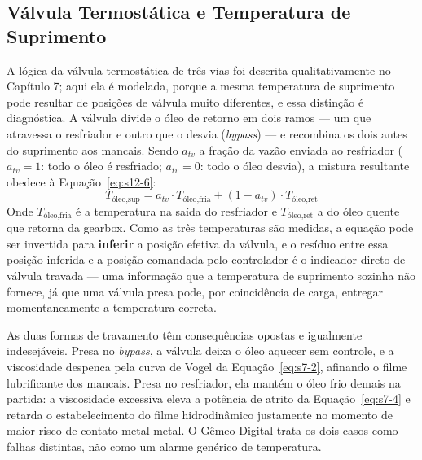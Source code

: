 \documentclass[12pt,a4paper]{article}
\numberwithin{equation}{section}
\numberwithin{table}{section}
\numberwithin{figure}{section}
\begin{document}
	\subsection{\textbf{Válvula Termostática e Temperatura de Suprimento}}
	A lógica da válvula termostática de três vias foi descrita qualitativamente no Capítulo 7; aqui ela é modelada, porque a mesma temperatura de suprimento pode resultar de posições de válvula muito diferentes, e essa distinção é diagnóstica. A válvula divide o óleo de retorno em dois ramos — um que atravessa o resfriador e outro que o desvia (\textit{bypass}) — e recombina os dois antes do suprimento aos mancais. Sendo $a_{tv}$ a fração da vazão enviada ao resfriador ($a_{tv}=1$: todo o óleo é resfriado; $a_{tv}=0$: todo o óleo desvia), a mistura resultante obedece à Equação~\eqref{eq:s12-6}:
	\begin{equation}\label{eq:s12-6}
	T_{\text{óleo,sup}} = a_{tv} \cdot T_{\text{óleo,fria}} + (1 - a_{tv}) \cdot T_{\text{óleo,ret}}
	\end{equation}
	Onde $T_{\text{óleo,fria}}$ é a temperatura na saída do resfriador e $T_{\text{óleo,ret}}$ a do óleo quente que retorna da gearbox. Como as três temperaturas são medidas, a equação pode ser invertida para \textbf{inferir} a posição efetiva da válvula, e o resíduo entre essa posição inferida e a posição comandada pelo controlador é o indicador direto de válvula travada — uma informação que a temperatura de suprimento sozinha não fornece, já que uma válvula presa pode, por coincidência de carga, entregar momentaneamente a temperatura correta.

	As duas formas de travamento têm consequências opostas e igualmente indesejáveis. Presa no \textit{bypass}, a válvula deixa o óleo aquecer sem controle, e a viscosidade despenca pela curva de Vogel da Equação~\eqref{eq:s7-2}, afinando o filme lubrificante dos mancais. Presa no resfriador, ela mantém o óleo frio demais na partida: a viscosidade excessiva eleva a potência de atrito da Equação~\eqref{eq:s7-4} e retarda o estabelecimento do filme hidrodinâmico justamente no momento de maior risco de contato metal-metal. O Gêmeo Digital trata os dois casos como falhas distintas, não como um alarme genérico de temperatura.
\end{document}
